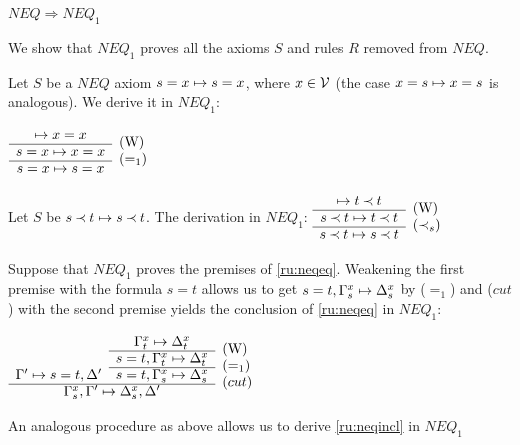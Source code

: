 \begin{LEMMA}\label{le:neqtoneq1} $NEQ \Rightarrow NEQ_1$ \end{LEMMA}
\begin{PROOF}
We show that $NEQ_1$ proves all the axioms $S$ and rules $R$ removed from $NEQ$.
\begin{LS}\MyLPar
\item Let $S$ be a $NEQ$ axiom $s=x\mathrel{\mapsto} s=x$, where $x\in\mbox{$\cal V$}$ (the case
$x=s\mathrel{\mapsto} x=s$ is analogous). We derive it in $NEQ_1$:
\begin{center} \( \begin{array}{cl}
  \Seq x=x & \raisebox{-1.2ex}[1.5ex][0ex]{(W)} \\ \cline{1-1}
  s=x\Seq x=x & \raisebox{-1.2ex}[1.5ex][0ex]{($=_1$)} \\ \cline{1-1}
  s=x\Seq s=x
\end{array} \) \end{center}
\item Let $S$ be $s\mathbin{\prec} t\mathrel{\mapsto} s\mathbin{\prec} t$. The derivation in $NEQ_1$:
\( \begin{array}{cl}
  \Seq t\Incl t & \raisebox{-1.2ex}[1.5ex][0ex]{(W)} \\ \cline{1-1}
  s\Incl t\Seq t\Incl t & \raisebox{-1.2ex}[1.5ex][0ex]{($\Incl_s$)} \\ \cline{1-1}
  s\Incl t\Seq s\Incl t
\end{array} \)
\item Suppose that $NEQ_1$ proves the premises of \ref{ru:neqeq}. Weakening the
first premise with the formula $s=t$ allows us to get $s=t,\Gamma_s^x\mathrel{\mapsto}\Delta_s^x$ by
($=_1$) and ($cut$) with the second premise yields the conclusion of 
\ref{ru:neqeq} in $NEQ_1$:
\begin{center} \( \begin{array}{ccl}
 & \Gamma_t^x\Seq\Delta_t^x & \raisebox{-1.2ex}[1.5ex][0ex]{(W)} \\ \cline{2-2}
 & s=t,\Gamma_t^x\Seq\Delta_t^x & \raisebox{-1.2ex}[1.5ex][0ex]{($=_1$)} 
      \\ \cline{2-2}
\Gamma'\Seq s=t,\Delta' & s=t,\Gamma_s^x\Seq\Delta_s^x 
   & \raisebox{-1.2ex}[1.5ex][0ex]{($cut$)} \\ \cline{1-2}
\multicolumn{2}{c}{\Gamma_s^x,\Gamma'\Seq\Delta_s^x,\Delta'}
\end{array} \) \end{center}
\item An analogous procedure as above allows us to derive \ref{ru:neqincl} in $NEQ_1$
\end{LS}
\end{PROOF}


